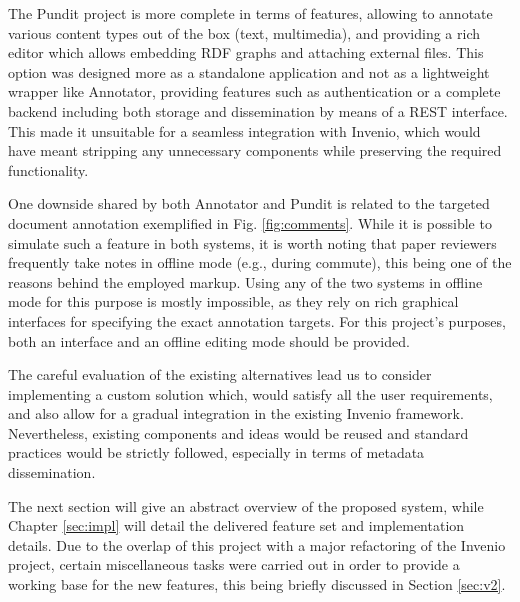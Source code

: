 The Pundit project is more complete in terms of features, allowing to annotate
various content types out of the box (text, multimedia), and providing a rich
editor which allows embedding RDF graphs and attaching external files. This
option was designed more as a standalone application and not as a lightweight
wrapper like Annotator, providing features such as authentication or a
complete backend including both storage and dissemination by means of a REST
interface.  This made it unsuitable for a seamless integration with Invenio,
which would have meant stripping any unnecessary components while preserving
the required functionality.

One downside shared by both Annotator and Pundit is related to the targeted
document annotation exemplified in Fig. \ref{fig:comments}. While it is
possible to simulate such a feature in both systems, it is worth noting that
paper reviewers frequently take notes in offline mode (e.g., during commute),
this being one of the reasons behind the employed markup. Using any of the two
systems in offline mode for this purpose is mostly impossible, as they rely on
rich graphical interfaces for specifying the exact annotation targets. For
this project's purposes, both an interface and an offline editing mode should
be provided.

The careful evaluation of the existing alternatives lead us to consider
implementing a custom solution which, would satisfy all the user requirements,
and also allow for a gradual integration in the existing Invenio framework.
Nevertheless, existing components and ideas would be reused and standard
practices would be strictly followed, especially in terms of metadata
dissemination.

The next section will give an abstract overview of the proposed system,
while Chapter \ref{sec:impl} will detail the delivered feature set and
implementation details. Due to the overlap of this project with a major
refactoring of the Invenio project, certain miscellaneous tasks were carried
out in order to provide a working base for the new features, this being briefly
discussed in Section \ref{sec:v2}.
